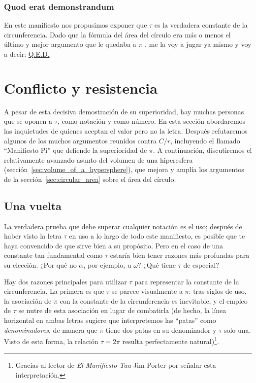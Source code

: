     \subsubsection{Quod erat demonstrandum} %
    \label{sec:quod_erat_demonstrandum}

En este manifiesto nos propusimos exponer que $\tau$ es la verdadera constante de la circunferencia. Dado que la fórmula del área del círculo era más o menos el último y mejor argumento que le quedaba a $\pi$ , me la voy a jugar ya mismo y voy a decir: \href{https://es.wikipedia.org/wiki/Quod_erat_demonstrandum}{Q.E.D.}



\section{Conflicto y resistencia} %
\label{sec:conflict_and_resistance}

A pesar de esta decisiva demostración de su superioridad, hay muchas personas que se oponen a $\tau$, como notación y como número. En esta sección abordaremos las inquietudes de quienes aceptan el valor pero no la letra. Después refutaremos algunos de los muchos argumentos reunidos contra $C/r$, incluyendo el llamado ``Manifiesto Pi'' que defiende la superioridad de $\pi$. A continuación, discutiremos el relativamente avanzado asunto del volumen de una hiperesfera (sección~\ref{sec:volume_of_a_hypersphere}), que mejora y amplía los argumentos de la sección~\ref{sec:circular_area} sobre el área del círculo.

  \subsection{Una vuelta} %
  \label{sec:one_turn}

La verdadera prueba que debe superar cualquier notación es el uso; después de haber visto la letra $\tau$ en uso a lo largo de todo este manifiesto, es posible que te haya convencido de que sirve bien a su propósito. Pero en el caso de una constante tan fundamental como $\tau$ estaría bien tener razones más profundas para su elección. ¿Por qué no $\alpha$, por ejemplo, u $\omega$? ¿Qué tiene $\tau$ de especial?

Hay dos razones principales para utilizar $\tau$ para representar la constante de la circunferencia. La primera es que $\tau$ se parece visualmente a $\pi$: tras siglos de uso, la asociación de $\pi$ con la constante de la circunferencia es inevitable, y el empleo de $\tau$ se nutre de esta asociación en lugar de combatirla (de hecho, la línea horizontal en ambas letras sugiere que interpretemos las ``patas'' como \emph{denominadores}, de manera que $\pi$ tiene dos patas en su denominador y $\tau$ solo una. Visto de esta forma, la relación $\tau = 2\pi$ resulta perfectamente natural)\footnote{Gracias al lector de \emph{El Manifiesto Tau} Jim Porter por señalar esta interpretación.}.

